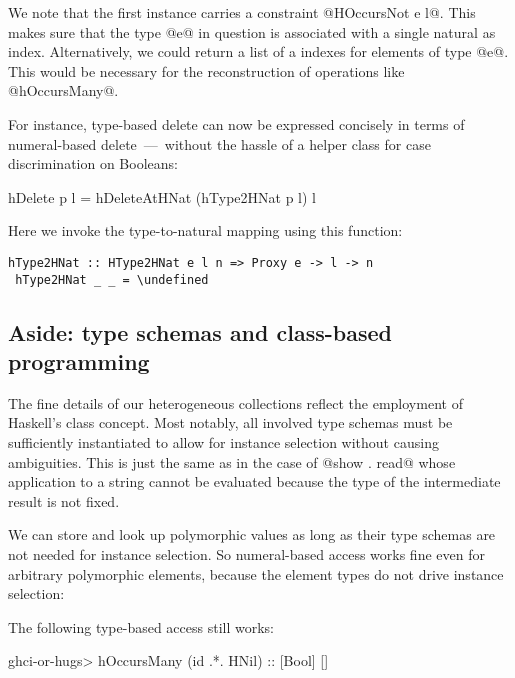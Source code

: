 \documentclass[nocopyrightspace,preprint]{sigplan-proc}
\newcommand{\undefined}{\ensuremath{\bot}}
\begin{document}
We note that the first instance carries a constraint
%
@HOccursNot e l@.
%
This makes sure that the type @e@ in question is associated with a
single natural as index.  Alternatively, we could return a list of a
indexes for elements of type @e@. This would be necessary for the
reconstruction of operations like @hOccursMany@.

For instance, type-based delete can now be expressed concisely in
terms of numeral-based delete~---~without the hassle of a helper class
for case discrimination on Booleans:

\begin{code}
 hDelete p l = hDeleteAtHNat (hType2HNat p l) l
\end{code}

Here we invoke the type-to-natural mapping using this function:

\begin{Verbatim}[commandchars=\\\{\}]
 hType2HNat :: HType2HNat e l n => Proxy e -> l -> n
 hType2HNat _ _ = \undefined
\end{Verbatim}



\medskip

\subsection*{Aside: type schemas and class-based programming}

The fine details of our heterogeneous collections reflect the
employment of Haskell's class concept. Most notably, all involved type
schemas must be sufficiently instantiated to allow for instance
selection without causing ambiguities. This is just the same as in the
case of @show . read@ whose application to a string cannot be
evaluated because the type of the intermediate result is not fixed.

We can store and look up polymorphic values as long as their type
schemas are not needed for instance selection. So numeral-based access
works fine even for arbitrary polymorphic elements, because the
element types do not drive instance selection:


The following type-based access still works:

\begin{code}
 ghci-or-hugs> hOccursMany (id .*. HNil) :: [Bool]
 []
\end{code}
\end{document}
